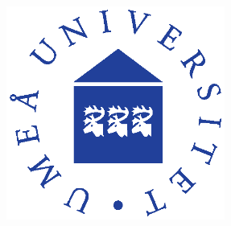 \documentclass[class=report, float=false, crop=false]{standalone}
\begin{document}
\begin{center}
{\begin{center}
\end{center}
} %

\vspace{0.5cm}

\includegraphics[height=7cm]{Umea_University.eps}

\end{center}

\vfill
\newpage
\end{document}
